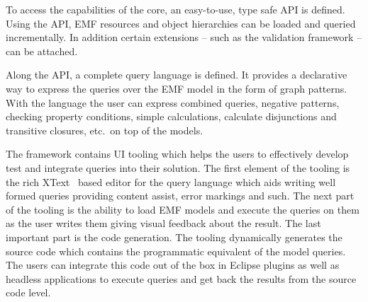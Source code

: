 To access the capabilities of the core, an easy-to-use, type safe API is
defined. Using the API, EMF resources and object hierarchies can be loaded and
queried incrementally. In addition certain extensions -- such as the validation
framework -- can be attached.

Along the API, a complete query language is defined. It provides a declarative
way to express the queries over the EMF model in the form of graph patterns.
With the language the user can express combined queries, negative patterns,
checking property conditions, simple calculations, calculate disjunctions and
transitive closures, etc.~on top of the models.

The framework contains UI tooling which helps the users to effectively develop
test and integrate queries into their solution. The first element of the tooling
is the rich XText~\cite{XtextWeb} based editor for the query language which aids writing well
formed queries providing content assist, error markings and such. The next part
of the tooling is the ability to load EMF models and execute the queries on them
as the user writes them giving visual feedback about the result.
The last important part is the code generation. The tooling dynamically
generates the source code which contains the programmatic equivalent of the
model queries. The users can integrate this code out of the box in Eclipse
plugins as well as headless applications to execute queries and get back the
results from the source code level.




